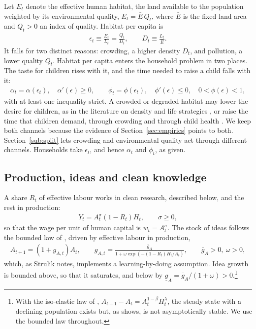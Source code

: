 \documentclass[11pt]{article}
\begin{document}
Let $E_t$ denote the effective human habitat, the land available to the population weighted by its
environmental quality, $E_t=\bar E\,Q_t$, where $\bar E$ is the fixed land area and $Q_t>0$ an index of
quality. Habitat per capita is
\begin{align}
\epsilon_t\equiv\frac{E_t}{L_t}=\frac{Q_t}{D_t},
\qquad D_t\equiv\frac{L_t}{\bar E}.
\label{eq:eps_def}
\end{align}
It falls for two distinct reasons: crowding, a higher density $D_t$, and pollution, a lower quality
$Q_t$. Habitat per capita enters the household problem in two places. The taste for children rises
with it, and the time needed to raise a child falls with it:
\begin{align}
\alpha_t=\alpha(\epsilon_t),\quad \alpha'(\epsilon)\ge0,
\qquad
\phi_t=\phi(\epsilon_t),\quad \phi'(\epsilon)\le0,\quad 0<\phi(\epsilon)<1,
\label{eq:alpha_eps}
\end{align}
with at least one inequality strict. A crowded or degraded habitat may lower the desire for children,
as in the literature on density and life strategies \citep{lutz2006,sng2017}, or raise the time that children demand, through crowding \citep{DAO2013442,dao25} and through child
health \citep{mari10,Varvarigos2013}. We keep both channels
because the evidence of Section~\ref{sec:empirics} points to both. Section~\ref{sub:split} lets crowding
and environmental quality act through different channels. Households take $\epsilon_t$, and hence
$\alpha_t$ and $\phi_t$, as given.

\subsection{Production, ideas and clean knowledge}
A share $R_t$ of effective labour works in clean research, described below, and the rest in production:
\begin{align}
Y_t=A_t^{\sigma}(1-R_t)H_t,\qquad \sigma\ge0,
\label{eq:Y_hab}
\end{align}
so that the wage per unit of human capital is $w_t=A_t^{\sigma}$. The stock of ideas follows the bounded
law of \citet{STRULIK2024104943}, driven by effective labour in production,
\begin{align}
A_{t+1}=(1+g_{A,t})A_t,
\qquad
g_{A,t}=\frac{\bar g_A}{1+\omega\exp\!\left(-(1-R_t)H_t/A_t\right)},
\qquad \bar g_A>0,\ \omega>0,
\label{eq:gA_logistic}
\end{align}
which, as Strulik notes, implements a learning-by-doing assumption. Idea growth is bounded above,
so that it saturates, and below by $\underline g_A=\bar g_A/(1+\omega)>0$.\footnote{With the
iso-elastic law of \citet{jones22}, $A_{t+1}-A_t=A_t^{1-\beta}H_t^{\lambda}$, the steady state with a
declining population exists but, as \citet[Section~2.5]{STRULIK2024104943} shows, is not
asymptotically stable. We use the bounded law throughout.}
\end{document}
